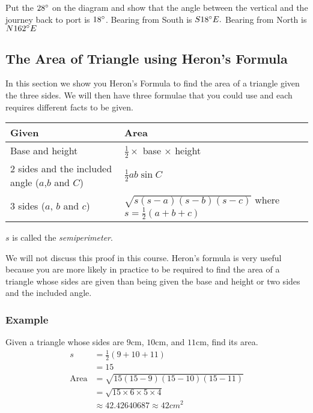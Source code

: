 Put the $28 \mbox{{\ensuremath{{}^\circ}}}$ on the diagram and show that the angle between the vertical and the journey back to port
is $18 \mbox{{\ensuremath{{}^\circ}}}$. Bearing from South is $S 18 \mbox{{\ensuremath{{}^\circ}}} E\text{.}$ Bearing from North is $N 162 \mbox{{\ensuremath{{}^\circ}}} E$ 

\subsection{The Area of Triangle using Heron's Formula}
In this section we show you Heron's Formula to find the area of a triangle given the three sides. We
will then have three formulae that you could use and each requires different facts to be given. 


\begin{tabular}[c]{|l|l|}\hline
\textbf{Given}
& \textbf{Area}  \\
\hline
Base and height
& $\frac{1}{2} \times $ base $ \times $ height  \\
\hline
2 sides and the included angle
($a$,$b$ and $C$)  & $\frac{1}{2} a b \sin  C$  \\
\hline
3 sides ($a$, $b$ and $c$)  & $\sqrt{s \left (s -a\right ) \left (s -b\right ) \left (s -c\right )}$ where $s =\frac{1}{2} \left (a +b +c\right )$  \\
\hline
\end{tabular}

$s$ is called the \emph{semiperimeter}. 

We will not discuss this proof in this course. Heron's
formula is very useful because you are more likely in practice to be required to find the area of a triangle whose sides are given than being given the
base and height or two sides and the included angle. 

\subsubsection{Example}
Given a triangle whose sides are $9 \mbox{cm}$, $10 \mbox{cm}$, and $11 \mbox{cm}$, find its area.
\begin{align*}s &  = \frac{1}{2} \left (9 +10 +11\right ) \\
 &  = 15 \\
\text{Area} &  = \sqrt{15 (15 -9) (15 -10) (15 -11)} \\
 &  = \sqrt{15 \times 6 \times 5 \times 4} \\
 &  \approx 42.42640687 \approx 42 cm^{2}\end{align*}

